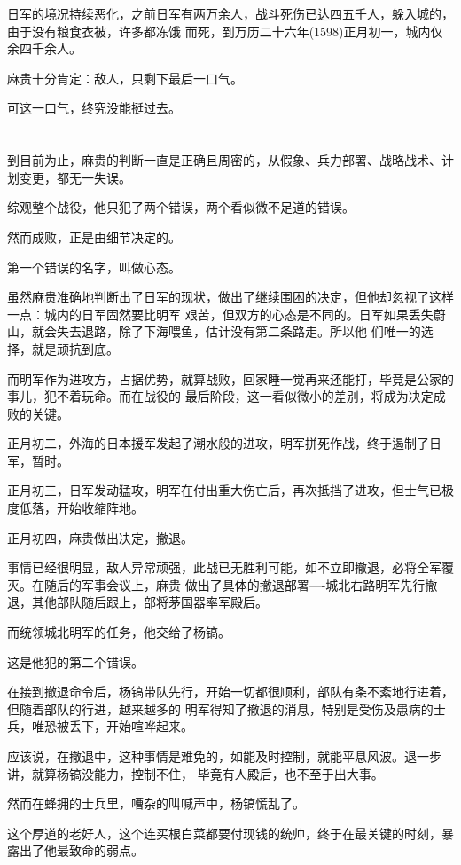 \documentclass[11pt,a4paper,onecolumn]{article}
\begin{document}
日军的境况持续恶化，之前日军有两万余人，战斗死伤已达四五千人，躲入城的，由于没有粮食衣被，许多都冻饿
而死，到万历二十六年(1598)正月初一，城内仅余四千余人。

麻贵十分肯定：敌人，只剩下最后一口气。

可这一口气，终究没能挺过去。

\section[\thesection]{}

到目前为止，麻贵的判断一直是正确且周密的，从假象、兵力部署、战略战术、计划变更，都无一失误。

综观整个战役，他只犯了两个错误，两个看似微不足道的错误。

然而成败，正是由细节决定的。

第一个错误的名字，叫做心态。

虽然麻贵准确地判断出了日军的现状，做出了继续围困的决定，但他却忽视了这样一点：城内的日军固然要比明军
艰苦，但双方的心态是不同的。日军如果丢失蔚山，就会失去退路，除了下海喂鱼，估计没有第二条路走。所以他
们唯一的选择，就是顽抗到底。

而明军作为进攻方，占据优势，就算战败，回家睡一觉再来还能打，毕竟是公家的事儿，犯不着玩命。而在战役的
最后阶段，这一看似微小的差别，将成为决定成败的关键。

正月初二，外海的日本援军发起了潮水般的进攻，明军拼死作战，终于遏制了日军，暂时。

正月初三，日军发动猛攻，明军在付出重大伤亡后，再次抵挡了进攻，但士气已极度低落，开始收缩阵地。

正月初四，麻贵做出决定，撤退。

事情已经很明显，敌人异常顽强，此战已无胜利可能，如不立即撤退，必将全军覆灭。在随后的军事会议上，麻贵
做出了具体的撤退部署----城北右路明军先行撤退，其他部队随后跟上，部将茅国器率军殿后。

而统领城北明军的任务，他交给了杨镐。

这是他犯的第二个错误。

在接到撤退命令后，杨镐带队先行，开始一切都很顺利，部队有条不紊地行进着，但随着部队的行进，越来越多的
明军得知了撤退的消息，特别是受伤及患病的士兵，唯恐被丢下，开始喧哗起来。

应该说，在撤退中，这种事情是难免的，如能及时控制，就能平息风波。退一步讲，就算杨镐没能力，控制不住，
毕竟有人殿后，也不至于出大事。

然而在蜂拥的士兵里，嘈杂的叫喊声中，杨镐慌乱了。

这个厚道的老好人，这个连买根白菜都要付现钱的统帅，终于在最关键的时刻，暴露出了他最致命的弱点。
\end{document}
